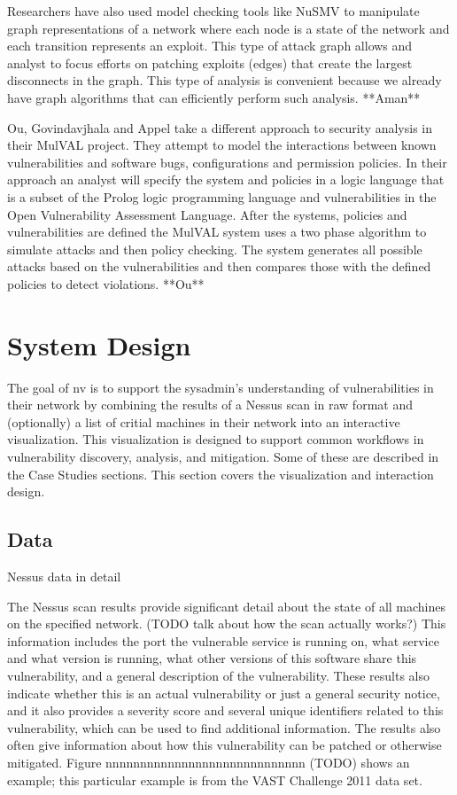 \documentclass{acm_proc_article-sp}
\begin{document}
Researchers have also used model checking tools like NuSMV to manipulate graph
representations of a network where each node is a state of the network and each
transition represents an exploit.
 This type of attack graph allows and analyst
to focus efforts on patching exploits (edges) that create the largest
disconnects in the graph.
 This type of analysis is convenient because we
already have graph algorithms that can efficiently perform such analysis.
**Aman**

Ou, Govindavjhala and Appel take a different approach to security analysis in
their MulVAL project.
They attempt to model the interactions between known vulnerabilities and
software bugs, configurations and permission policies.
 In their approach an
analyst will specify the system and policies in a logic language that is a subset of the
Prolog logic programming language and vulnerabilities in the Open Vulnerability
Assessment Language.
After the systems, policies and vulnerabilities are defined
the MulVAL system uses a two phase algorithm to simulate attacks and then policy
checking.
 The system generates all possible attacks based on the
vulnerabilities and then compares those with the defined policies to detect
violations.
**Ou**

\section{System Design}
The goal of nv is to support the sysadmin's understanding of vulnerabilities in their network by combining the results of a Nessus scan in raw format and (optionally) a list of critial machines in their network into an interactive visualization.
This visualization is designed to support common workflows in vulnerability discovery, analysis, and mitigation.
Some of these are described in the Case Studies sections.
This section covers the visualization and interaction design.

\subsection{Data}
Nessus data in detail

The Nessus scan results provide significant detail about the state of all machines on the specified network.
(TODO talk about how the scan actually works?) This information includes the port the vulnerable service is running on, what service and what version is running, what other versions of this software share this vulnerability, and a general description of the vulnerability.
These results also indicate whether this is an actual vulnerability or just a general security notice, and it also provides a severity score and several unique identifiers related to this vulnerability, which can be used to find additional information.
The results also often give information about how this vulnerability can be patched or otherwise mitigated.
Figure nnnnnnnnnnnnnnnnnnnnnnnnnnnnn (TODO) shows an example; this particular example is from the VAST Challenge 2011 data set.
\end{document}
